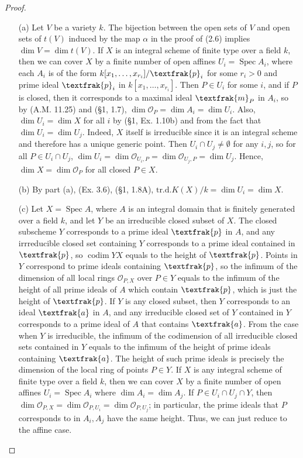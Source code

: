 \documentclass{article}
\newcommand{\goth}[1]{\textfrak{#1}}
\newcommand{\OO}{\mathscr{O}}
\DeclareMathOperator{\spec}{Spec}
\DeclareMathOperator{\codim}{codim}
\begin{document}
\begin{enumerate} [label=\textbf{\arabic*.}, leftmargin=0em]
\begin{proof} $ $ \vspace{0pt}
\begin{itemize} [leftmargin=0cm]
    \item[(a)] Let $V$ be a variety $k$. The bijection between the open sets of $V$ and open sets of $t(V)$ induced by the map $\alpha$ in the proof of (2.6) implies $\dim{V} = \dim{t(V)}$. If $X$ is an integral scheme of finite type over a field $k$, then we can cover $X$ by a finite number of open affines $U_i = \spec{A_i}$, where each $A_i$ is of the form $k[x_1, \dots, x_{r_i}] / \goth{p}_i$ for some $r_i > 0$ and prime ideal $\goth{p}_i$ in $k[x_1, \dots, x_{r_i}]$. Then $P \in U_i$ for some $i$, and if $P$ is closed, then it corresponds to a maximal ideal $\goth{m}_P$ in $A_i$, so by (A.M. 11.25) and (\S 1, 1.7), $\dim{\OO_P} = \dim{A_i} = \dim{U_i}$. Also, $\dim{U_i} = \dim{X}$ for all $i$ by (\S 1, Ex. 1.10b) and from the fact that $\dim{U_i} = \dim{U_j}$. Indeed, $X$ itself is irreducible since it is an integral scheme and therefore has a unique generic point. Then $U_i \cap U_j \neq \emptyset$ for any $i, j$, so for all $P \in U_i \cap U_j$, $\dim{U_i} = \dim{\OO_{U_i, P}} = \dim{\OO_{U_j, P}} = \dim{U_j}$. Hence, $\dim{X} = \dim{\OO_P}$ for all closed $P \in X$.

    \item[(b)] By part (a), (Ex. 3.6), (\S 1, 1.8A), $\text{tr.d.} K(X) / k = \dim{U_i} = \dim{X}$.

    \item[(c)] Let $X = \spec{A}$, where $A$ is an integral domain that is finitely generated over a field $k$, and let $Y$ be an irreducible closed subset of $X$. The closed subscheme $Y$ corresponds to a prime ideal $\goth{p}$ in $A$, and any irrreducible closed set containing $Y$ corresponds to a prime ideal contained in $\goth{p}$, so $\codim{Y}{X}$ equals to the height of $\goth{p}$. Points in $Y$ correspond to prime ideals containing $\goth{p}$, so the infimum of the dimension of all local rings $\OO_{P, X}$ over $P \in Y$ equals to the infimum of the height of all prime ideals of $A$ which contain $\goth{p}$, which is just the height of $\goth{p}$. If $Y$ is any closed subset, then $Y$ corresponds to an ideal $\goth{a}$ in $A$, and any irreducible closed set of $Y$ contained in $Y$ corresponds to a prime ideal of $A$ that contains $\goth{a}$. From the case when $Y$ is irreducible, the infimum of the codimension of all irreducible closed sets contained in $Y$ equals to the infimum of the height of prime ideals containing $\goth{a}$. The height of such prime ideals is precisely the dimension of the local ring of points $P \in Y$. If $X$ is any integral scheme of finite type over a field $k$, then we can cover $X$ by a finite number of open affines $U_i = \spec{A_i}$ where $\dim{A_i} = \dim{A_j}$. If $P \in U_i \cap U_j \cap Y$, then $\dim{\OO_{P, X}} = \dim{\OO_{P, U_i}} = \dim{\OO_{P, U_j}}$; in particular, the prime ideals that $P$ corresponds to in $A_i, A_j$ have the same height. Thus, we can just reduce to the affine case.
    

\end{itemize}
\end{proof}
\end{enumerate}
\end{document}
